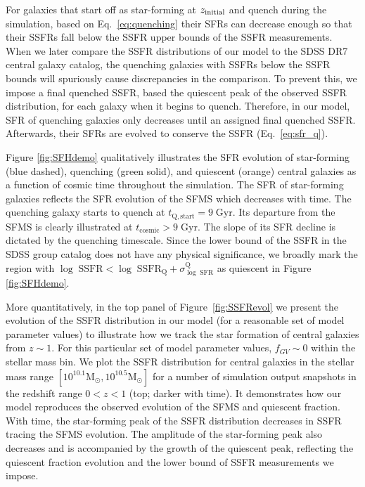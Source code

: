 For galaxies that start off as star-forming at $z_\mathrm{initial}$ and 
quench during the simulation, based on Eq.~\ref{eq:quenching} 
their SFRs can decrease enough so that their SSFRs fall below 
the SSFR upper bounds of the \cite{Brinchmann:2004aa} SSFR 
measurements. When we later compare the SSFR distributions of our model to 
the SDSS DR7 central galaxy catalog, the quenching galaxies with 
SSFRs below the SSFR bounds will spuriously cause discrepancies 
in the comparison. To prevent this, we impose a final quenched 
SSFR, based the quiescent peak of the observed SSFR distribution, 
for each galaxy when it begins to quench. Therefore, in our model, 
SFR of quenching galaxies only decreases until an assigned final 
quenched SSFR. Afterwards, their SFRs are evolved to conserve 
the SSFR (Eq.~\ref{eq:sfr_q}). 

Figure \ref{fig:SFHdemo} qualitatively illustrates the SFR evolution of 
star-forming (blue dashed), quenching (green solid), and quiescent (orange) 
central galaxies as a function of cosmic time throughout the simulation. 
The SFR of star-forming galaxies reflects the SFR evolution of the SFMS 
which decreases with time.  The quenching galaxy starts to quench
at $t_\mathrm{Q, start} = 9\;\mathrm{Gyr}$.  Its departure from the SFMS 
is clearly illustrated at $t_\mathrm{cosmic} > 9\;\mathrm{Gyr}$. The slope
of its SFR decline is dictated by the quenching timescale. Since the 
lower bound of the SSFR in the SDSS group catalog does not have any 
physical significance, we broadly mark the region with 
$\log\;\mathrm{SSFR} < \log\;\mathrm{SSFR}_\mathrm{Q} + 
\sigma^\mathrm{Q}_{\log\;\mathrm{SFR}}$ as quiescent in Figure \ref{fig:SFHdemo}. 

More quantitatively, in the top panel of Figure~\ref{fig:SSFRevol} 
we present the evolution of the SSFR distribution in our model 
(for a reasonable set of model parameter values) to illustrate how 
we track the star formation of central galaxies from $z \sim 1$. 
For this particular set of model parameter values, $f_{GV} \sim 0$ 
within the stellar mass bin.
We plot the SSFR distribution for central galaxies in the stellar 
mass range $[10^{10.1}\mathrm{M}_\odot, 10^{10.5}\mathrm{M}_\odot]$ 
for a number of simulation output snapshots in the redshift range 
$0 < z < 1$ (top; darker with time). 
It demonstrates how our model reproduces the observed evolution 
of the SFMS and quiescent fraction.
With time, the star-forming peak of the SSFR distribution 
decreases in SSFR tracing the SFMS evolution. The amplitude of 
the star-forming peak also decreases and is accompanied by the 
growth of the quiescent peak, reflecting the quiescent 
fraction evolution and the lower bound of SSFR measurements we impose.

